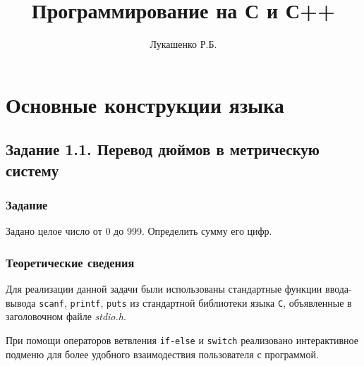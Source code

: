 \documentclass[12pt,a4paper]{report}
\author{Лукашенко Р.Б.}
\title{Программирование на С и С++}
\begin{document}
\maketitle

\tableofcontents{}

\chapter{Основные конструкции языка}
\section{Задание 1.1. Перевод дюймов в метрическую систему}
\subsection{Задание}

\hspace{\parindent}Задано целое число от 0 до 999. Определить сумму его цифр.

\subsection{Теоретические сведения}
\hspace{\parindent}Для реализации данной задачи были использованы стандартные функции ввода-вывода \texttt{scanf}, \texttt{printf}, \texttt{puts} из стандартной библиотеки языка \verb+С+, объявленные в заголовочном файле \textit{stdio.h}.

При помощи операторов ветвления \texttt{if-else} и \texttt{switch} реализовано интерактивное подменю для более удобного взаимодествия пользователя с программой.
\end{document}
